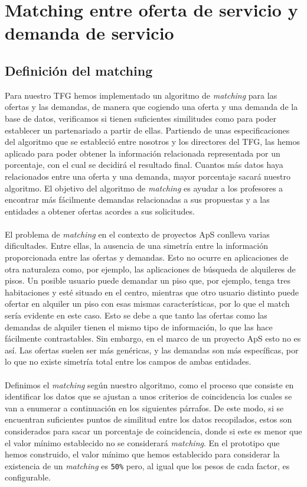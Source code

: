 \documentclass[11pt]{book}
\begin{document}
\chapter{Matching entre oferta de servicio y demanda de servicio}\label{cap:matching}

\section{Definición del matching }

Para nuestro TFG hemos implementado un algoritmo de \emph{matching} para las ofertas y las demandas, de manera que cogiendo una oferta y una demanda de la base de datos, verificamos si tienen suficientes similitudes como para poder establecer un partenariado a partir de ellas. Partiendo de unas especificaciones del algoritmo que se estableció entre nosotros y los directores del TFG, las hemos aplicado para poder obtener la información relacionada representada por un porcentaje, con el cual se decidirá el resultado final.  Cuantos más datos haya relacionados entre una oferta y una demanda, mayor porcentaje sacará nuestro algoritmo. El objetivo del algoritmo de \emph{matching} es ayudar a los profesores a encontrar más fácilmente demandas relacionadas a sus propuestas y a las entidades a obtener ofertas acordes a sus solicitudes. \\\\
El problema de \emph{matching} en el contexto de proyectos ApS conlleva varias dificultades. Entre ellas, la ausencia de una simetría entre la información proporcionada entre las ofertas y demandas. Esto no ocurre en aplicaciones de otra naturaleza como, por ejemplo, las aplicaciones de búsqueda de alquileres de pisos. Un posible usuario puede demandar un piso que, por ejemplo, tenga tres habitaciones y esté situado en el centro, mientras que otro usuario distinto puede ofertar en alquiler un piso con esas mismas características, por lo que el match sería evidente en este caso. Esto se debe a que tanto las ofertas como las demandas de alquiler tienen el mismo tipo de información, lo que las hace fácilmente contrastables. Sin embargo, en el marco de un proyecto ApS esto no es así. Las ofertas suelen ser más genéricas, y las demandas son más específicas, por lo que no existe simetría total entre los campos de ambas entidades.\\\\
Definimos el \emph{matching} según nuestro algoritmo, como el proceso que consiste en identificar los datos que se ajustan a unos criterios de coincidencia los cuales se van a enumerar a continuación en los siguientes párrafos. De este modo, si se encuentran suficientes puntos de similitud entre los datos recopilados, estos son considerados para sacar un porcentaje de coincidencia, donde si este es menor que el valor mínimo establecido no se considerará \emph{matching}. En el prototipo que hemos construido, el valor mínimo que hemos
establecido para considerar la existencia de un \emph{matching} es \texttt{50\%} pero, al
igual que los pesos de cada factor, es configurable.
\\\\
\end{document}
